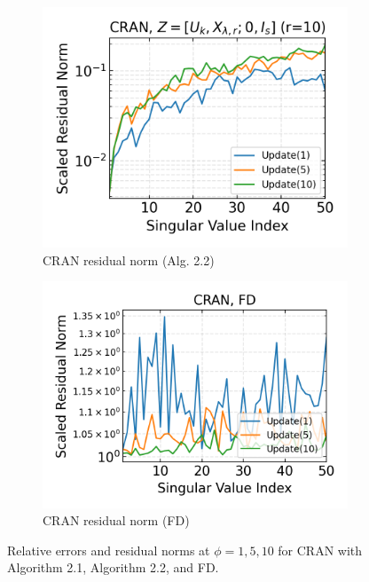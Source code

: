 \begin{figure}[h]
\begin{subfigure}[b]{0.32\textwidth}
  \end{subfigure}
  \hfill
  \begin{subfigure}[b]{0.32\textwidth}
    \centering
    \includegraphics[width=\textwidth]{../openreview/figures/report_figures/CRAN_bcg_n_batches_10_k_dims_50_rval_10_res_norm.png}
    \caption{CRAN residual norm (Alg. 2.2)}
  \end{subfigure}
  \hfill
  \begin{subfigure}[b]{0.32\textwidth}
    \centering
    \includegraphics[width=\textwidth]{../openreview/figures/report_figures/CRAN_frequent-directions_n_batches_10_k_dims_50_res_norm.png}
    \caption{CRAN residual norm (FD)}
    \label{fig:cran_res_norm_fd}
  \end{subfigure}
  \caption{Relative errors and residual norms at $\phi=1,5,10$ for CRAN with Algorithm 2.1, Algorithm 2.2, and FD.}
  \label{fig:cran_relerr_resnorm}
\end{figure}
